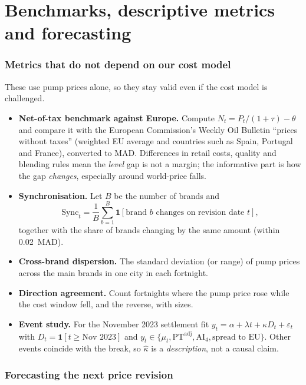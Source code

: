 \documentclass[11pt,a4paper]{article}
\theoremstyle{definition}
\newcommand{\PT}{\mathrm{PT}}
\newcommand{\AI}{\mathrm{AI}}
\newcommand{\ind}{\mathbf{1}}
\begin{document}
\part{Benchmarks, descriptive metrics and forecasting}

\section{Metrics that do not depend on our cost model}

These use pump prices alone, so they stay valid even if the cost model is challenged.
\begin{itemize}
\item \textbf{Net-of-tax benchmark against Europe.} Compute $N_t=P_t/(1+\tau)-\theta$ and compare it with the European Commission's Weekly Oil Bulletin ``prices without taxes'' (weighted EU average and countries such as Spain, Portugal and France), converted to MAD. Differences in retail costs, quality and blending rules mean the \emph{level} gap is not a margin; the informative part is how the gap \emph{changes}, especially around world-price falls.
\item \textbf{Synchronisation.} Let $B$ be the number of brands and
  \[
  \text{Sync}_t=\frac1B\sum_{b=1}^{B}\ind[\text{brand } b \text{ changes on revision date } t],
  \]
  together with the share of brands changing by the same amount (within 0.02~MAD).
\item \textbf{Cross-brand dispersion.} The standard deviation (or range) of pump prices across the main brands in one city in each fortnight.
\item \textbf{Direction agreement.} Count fortnights where the pump price rose while the cost window fell, and the reverse, with sizes.
\item \textbf{Event study.} For the November 2023 settlement fit $y_t=\alpha+\lambda t+\kappa D_t+\varepsilon_t$ with $D_t=\ind[t\ge \text{Nov 2023}]$ and $y_t\in\{\mu_t,\PT^{\text{adj}},\AI_4,\text{spread to EU}\}$. Other events coincide with the break, so $\hat\kappa$ is a \emph{description}, not a causal claim.
\end{itemize}

\section{Forecasting the next price revision}
\end{document}
